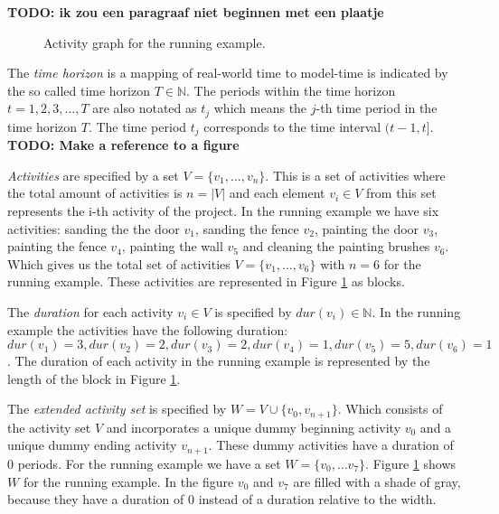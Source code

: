 \documentclass{article}
\theoremstyle{definition}
\newcommand{\inputtikz}[1]{}
\newcommand{\TODO}[1]{{\color{red}\textbf{TODO: #1}}}
\newcommand{\dur}[1]{\ensuremath{dur(v_{#1})}} %
\begin{document}
\TODO{ik zou een paragraaf niet beginnen met een plaatje}

\begin{figure}[ht]
	\centering
	\inputtikz{activity_graph}
	\caption{Activity graph for the running example.}
	\label{fig:activity_graph}
\end{figure}

The \emph{time horizon} is a mapping of real-world time to model-time is indicated by the so called time horizon $T \in \mathbb{N}$.
The periods within the time horizon $t=1,2,3,\ldots,T$ are also notated as $t_j$ which means the $j$-th time period in the time horizon $T$. 
The time period $t_j$ corresponds to the time interval $(t-1,t]$. 
\TODO{Make a reference to a figure}

\emph{Activities} are specified by a set $V = \{v_1, \ldots, v_n\}$.
This is a set of activities where the total amount of activities is $n = |V|$ and each element $v_i \in V$ from this set represents the i-th activity of the project.
In the running example we have six activities: sanding the the door $v_1$, sanding the fence $v_2$,  painting the door $v_3$, painting the fence $v_4$, painting the wall $v_5$ and cleaning the painting brushes $v_6$. 
Which gives us the total set of activities $V = \{v_1, \ldots, v_6\}$ with $n = 6$ for the running example.
These activities are represented in Figure \ref{fig:activity_graph} as blocks.

The \emph{duration} for each activity $v_i \in V$ is specified by $\dur{i} \in \mathbb{N}$.
In the running example the activities have the following duration: $\dur{1} = 3, \dur{2} = 2, \dur{3} = 2, \dur{4} = 1, \dur{5} = 5, \dur{6} = 1$. 
The duration of each activity in the running example is represented by the length of the block in Figure \ref{fig:activity_graph}.

The \emph{extended activity set} is specified by $W = V \cup \{v_0, v_{n+1}\}$.
Which consists of the activity set $V$ and incorporates a unique dummy beginning activity $v_0$ and a unique dummy ending activity $v_{n+1}$. 
These dummy activities have a duration of $0$ periods.
For the running example we have a set $W = \{v_0, \ldots v_7\}$.
Figure \ref{fig:activity_graph} shows $W$ for the running example.
In the figure $v_0$ and $v_7$ are filled with a shade of gray, because they have a duration of $0$ instead of a duration relative to the width. 
\end{document}
